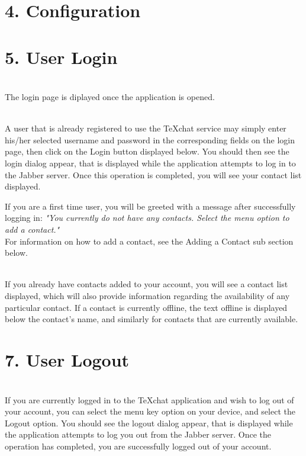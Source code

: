\documentclass[29pt,a4paper]{moderncv}
\begin{document}
\newpage
	\section*{4. Configuration}
\newpage
		
\newpage
		\section*{5. User Login}
		\vspace{4mm}
		\\The login page is diplayed once the application is opened.  
		
		\\A user that is already registered to use the TeXchat service may simply enter his/her selected username and password in the corresponding fields on the login page, then click on the Login button displayed below.  You should then see the login dialog appear, that is displayed while the application attempts to log in to the Jabber server.  Once this operation is completed, you will see your contact list displayed. 
		
		If you are a first time user, you will be greeted with a message after successfully logging in: \textit{"You currently do not have any contacts.  Select the menu option to add a contact."} 
		\\For information on how to add a contact, see the Adding a Contact sub section below.
		
		\\If you already have contacts added to your account, you will see a contact list displayed, which will also provide information regarding the availability of any particular contact.  If a contact is currently offline, the text offline is displayed below the contact’s name, and similarly for contacts that are currently available.
		\vspace{5mm}

\newpage
		\section*{7. User Logout}
		\vspace{5mm}
		\\If you are currently logged in to the TeXchat application and wish to log out of your account, you can select the menu key option on your device, and select the Logout option.  You should see the logout dialog appear, that is displayed while the application attempts to log you out from the Jabber server.  Once the operation has completed, you are successfully logged out of your account.
		\vspace{4mm}
\end{document}
